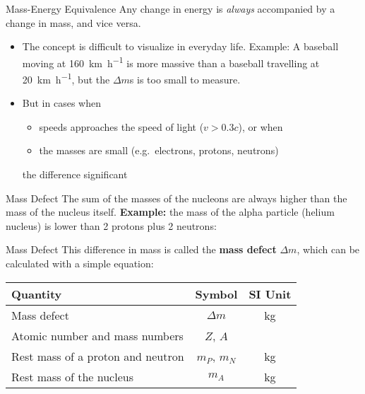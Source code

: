\documentclass[12pt,compress,aspectratio=169]{beamer}
\begin{document}
\begin{frame}{Mass-Energy Equivalence}
  Any change in energy is \emph{always} accompanied by a change in mass, and
  vice versa.
  

  \begin{itemize}
  \item\vspace{-.15in}The concept is difficult to visualize in everyday life.
    Example: A baseball moving at \SI{160}{\kilo\metre\per\hour} is more
    massive than a baseball travelling at \SI{20}{\kilo\metre\per\hour}, but
    the $\Delta m$s is too small to measure.
  \item But in cases when
    \begin{itemize}
      \item speeds approaches the speed of light ($v>0.3c$), or when
      \item the masses are small (e.g.\ electrons, protons, neutrons)
    \end{itemize}
    the difference significant
  \end{itemize}
\end{frame}



\begin{frame}{Mass Defect}
  The sum of the masses of the nucleons are always higher than the mass of the
  nucleus itself. \textbf{Example:} the mass of the alpha particle (helium
  nucleus) is lower than 2 protons plus 2 neutrons:
  \begin{center}
  \end{center}
\end{frame}



\begin{frame}{Mass Defect}
  This difference in mass is called the \textbf{mass defect} $\Delta m$, which
  can be calculated with a simple equation:
  
  \begin{center}
    \begin{tabular}{l|c|c}
      \rowcolor{pink}
      \textbf{Quantity}        & \textbf{Symbol} & \textbf{SI Unit} \\ \hline
      Mass defect              & $\Delta m$ & \si{\kilo\gram}\\
      Atomic number and mass numbers & $Z$, $A$ & \\
      Rest mass of a proton and neutron & $m_P$, $m_N$ & \si{\kilo\gram}\\
      Rest mass of the nucleus & $m_A$ & \si{\kilo\gram}\\
    \end{tabular}
  \end{center}
\end{frame}
\end{document}
